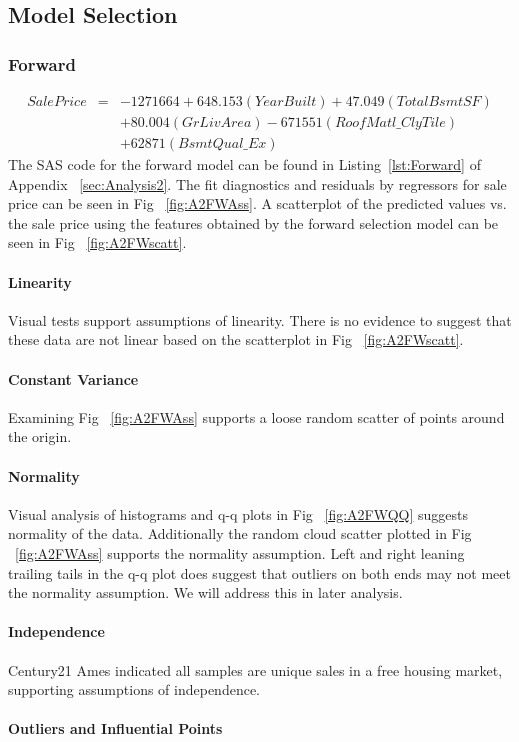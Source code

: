 \documentclass[11pt]{scrartcl} %
\begin{document}
\subsection{Model Selection}
\subsubsection{Forward}
\begin{eqnarray*}
SalePrice &=& -1271664 + 648.153(YearBuilt) + 47.049(TotalBsmtSF) \\
& & + 80.004(GrLivArea) - 671551(RoofMatl\_ClyTile)\\
& & + 62871(BsmtQual\_Ex)
\end{eqnarray*}
The SAS code for the forward model can be found in Listing~\ref{lst:Forward} of Appendix ~\ref{sec:Analysis2}.
The fit diagnostics and residuals by regressors for sale price can be seen in Fig ~\ref{fig:A2FWAss}. A scatterplot of the predicted values vs. the sale price using the features obtained by the forward selection model can be seen in Fig ~\ref{fig:A2FWscatt}.
\paragraph{Linearity} Visual tests support assumptions of linearity. There is no evidence to suggest that these data are not linear based on the scatterplot in Fig ~\ref{fig:A2FWscatt}.
\paragraph{Constant Variance} Examining Fig ~\ref{fig:A2FWAss} supports a loose random scatter of points around the origin. 
\paragraph{Normality} Visual analysis of histograms and q-q plots in Fig ~\ref{fig:A2FWQQ} suggests normality of the data. Additionally the random cloud scatter plotted in Fig ~\ref{fig:A2FWAss} supports the normality assumption. Left and right leaning trailing tails in the q-q plot does suggest that outliers on both ends may not meet the normality assumption. We will address this in later analysis.
\paragraph{Independence} Century21 Ames indicated all samples are unique sales in a free housing market, supporting assumptions of independence. 
\paragraph{Outliers and Influential Points}
\end{document}
